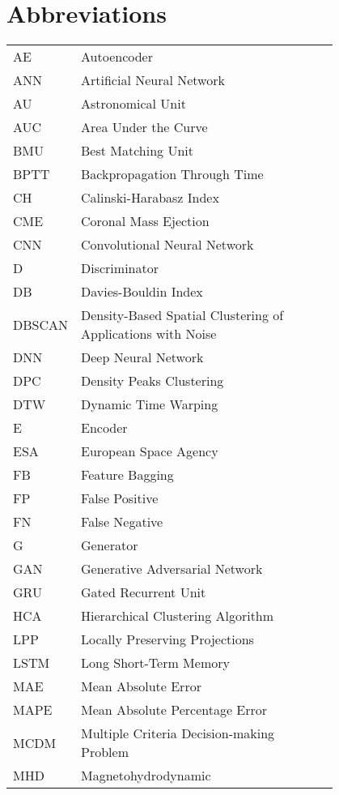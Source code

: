 \chapter*{Abbreviations}

\begin{flushleft}
\begin{tabular}{l p{0.8\linewidth}}
AE    & Autoencoder\\
ANN    & Artificial Neural Network\\
AU & Astronomical Unit \\
AUC   & Area Under the Curve\\
BMU & Best Matching Unit\\
BPTT & Backpropagation Through Time\\
CH & Calinski-Harabasz Index\\
CME      & Coronal Mass Ejection\\
CNN     & Convolutional Neural Network\\
D   & Discriminator\\
DB & Davies-Bouldin Index\\
DBSCAN & Density-Based Spatial Clustering of Applications with Noise\\
DNN     & Deep Neural Network\\
DPC & Density Peaks Clustering\\
DTW & Dynamic Time Warping\\
E  & Encoder\\
ESA & European Space Agency\\
FB & Feature Bagging\\
FP   & False Positive\\
FN  & False Negative\\
G   & Generator\\
GAN      & Generative Adversarial Network\\
GRU & Gated Recurrent Unit\\
HCA & Hierarchical Clustering Algorithm\\
LPP & Locally Preserving Projections\\
LSTM    & Long Short-Term Memory\\
MAE & Mean Absolute Error\\
MAPE & Mean Absolute Percentage Error\\
MCDM & Multiple Criteria Decision-making Problem\\
MHD   & Magnetohydrodynamic\\

\end{tabular}
\end{flushleft}
